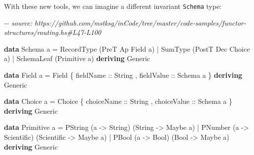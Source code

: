 \documentclass[]{article}
\newenvironment{Shaded}{}{}
\newcommand{\CommentTok}[1]{\textcolor[rgb]{0.38,0.63,0.69}{\textit{#1}}}
\newcommand{\DataTypeTok}[1]{\textcolor[rgb]{0.56,0.13,0.00}{#1}}
\newcommand{\KeywordTok}[1]{\textcolor[rgb]{0.00,0.44,0.13}{\textbf{#1}}}
\newcommand{\NormalTok}[1]{#1}
\newcommand{\OperatorTok}[1]{\textcolor[rgb]{0.40,0.40,0.40}{#1}}
\newcommand{\OtherTok}[1]{\textcolor[rgb]{0.00,0.44,0.13}{#1}}
\begin{document}
With these new tools, we can imagine a different invariant \texttt{Schema} type:

\begin{Shaded}
\begin{Highlighting}[]
\CommentTok{{-}{-} source: https://github.com/mstksg/inCode/tree/master/code{-}samples/functor{-}structures/routing.hs\#L47{-}L100}

\KeywordTok{data} \DataTypeTok{Schema}\NormalTok{ a }\OtherTok{=}
      \DataTypeTok{RecordType}\NormalTok{  (}\DataTypeTok{PreT}  \DataTypeTok{Ap}  \DataTypeTok{Field}\NormalTok{  a)}
    \OperatorTok{|} \DataTypeTok{SumType}\NormalTok{     (}\DataTypeTok{PostT} \DataTypeTok{Dec} \DataTypeTok{Choice}\NormalTok{ a)}
    \OperatorTok{|} \DataTypeTok{SchemaLeaf}\NormalTok{  (}\DataTypeTok{Primitive}\NormalTok{ a)}
  \KeywordTok{deriving} \DataTypeTok{Generic}

\KeywordTok{data} \DataTypeTok{Field}\NormalTok{ a }\OtherTok{=} \DataTypeTok{Field}
\NormalTok{    \{}\OtherTok{ fieldName  ::} \DataTypeTok{String}
\NormalTok{    ,}\OtherTok{ fieldValue ::} \DataTypeTok{Schema}\NormalTok{ a}
\NormalTok{    \}}
  \KeywordTok{deriving} \DataTypeTok{Generic}

\KeywordTok{data} \DataTypeTok{Choice}\NormalTok{ a }\OtherTok{=} \DataTypeTok{Choice}
\NormalTok{    \{}\OtherTok{ choiceName  ::} \DataTypeTok{String}
\NormalTok{    ,}\OtherTok{ choiceValue ::} \DataTypeTok{Schema}\NormalTok{ a}
\NormalTok{    \}}
  \KeywordTok{deriving} \DataTypeTok{Generic}

\KeywordTok{data} \DataTypeTok{Primitive}\NormalTok{ a }\OtherTok{=}
      \DataTypeTok{PString}\NormalTok{ (a }\OtherTok{{-}>} \DataTypeTok{String}\NormalTok{)     (}\DataTypeTok{String}     \OtherTok{{-}>} \DataTypeTok{Maybe}\NormalTok{ a)}
    \OperatorTok{|} \DataTypeTok{PNumber}\NormalTok{ (a }\OtherTok{{-}>} \DataTypeTok{Scientific}\NormalTok{) (}\DataTypeTok{Scientific} \OtherTok{{-}>} \DataTypeTok{Maybe}\NormalTok{ a)}
    \OperatorTok{|} \DataTypeTok{PBool}\NormalTok{   (a }\OtherTok{{-}>} \DataTypeTok{Bool}\NormalTok{)       (}\DataTypeTok{Bool}       \OtherTok{{-}>} \DataTypeTok{Maybe}\NormalTok{ a)}
  \KeywordTok{deriving} \DataTypeTok{Generic}


\end{Highlighting}
\end{Shaded}
\end{document}
